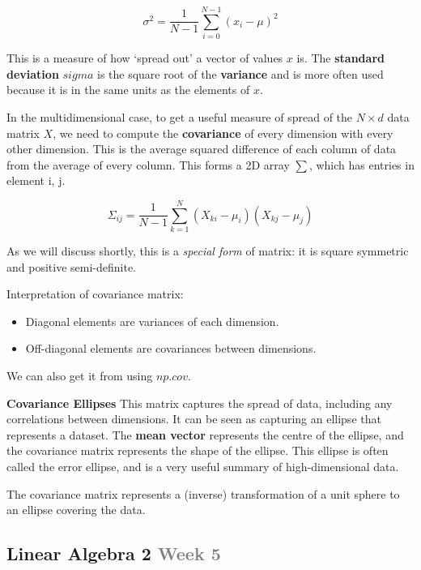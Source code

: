 \documentclass{article}
\begin{document}
\[\sigma^2 = \frac{1}{N - 1} \sum_{i=0}^{N-1} {(x_i - \mu)}^2\]

This is a measure of how `spread out' a vector of values $x$ is. The \textbf{standard deviation} $sigma$
is the square root of the \textbf{variance} and is more often used because it is in the same units as the
elements of $x$.

In the multidimensional case, to get a useful measure of spread of the $N \times d$ data matrix $X$, we need to
compute the \textbf{covariance} of every dimension with every other dimension. This is the average squared
difference of each column of data from the average of every column. This forms a 2D array $\sum$, which
has entries in element i, j.

\[\Sigma_{ij} = \frac{1}{N - 1} \sum_{k=1}^{N} (X_{ki} - \mu_i)(X_{kj} - \mu_j)\]

As we will discuss shortly, this is a \textit{special form} of matrix: it is square symmetric and positive
semi-definite.

Interpretation of covariance matrix:
\begin{itemize}
    \item Diagonal elements are variances of each dimension.
    \item Off-diagonal elements are covariances between dimensions.
\end{itemize}

We can also get it from using $np.cov$.

\textbf{Covariance Ellipses}
This matrix captures the spread of data, including any correlations between dimensions.
It can be seen as capturing an ellipse that represents a dataset. The \textbf{mean vector} represents
the centre of the ellipse, and the covariance matrix represents the shape of the ellipse.
This ellipse is often called the error ellipse, and is a very useful summary of high-dimensional data.

The covariance matrix represents a (inverse) transformation of a unit sphere to an ellipse covering the data.

\subsection*{Linear Algebra 2 \small\textcolor{gray}{Week 5}}
\end{document}
